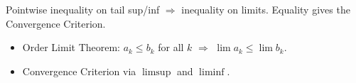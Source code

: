 \begin{remark*}
Pointwise inequality on tail sup/inf $\Rightarrow$ inequality on limits. Equality gives the Convergence Criterion.
\end{remark*}

\begin{remark*}[Dependencies]
\begin{itemize}
  \item Order Limit Theorem: $a_k \le b_k$ for all $k$ $\Rightarrow$ $\lim a_k \le \lim b_k$.
  \item Convergence Criterion via $\limsup$ and $\liminf$.
\end{itemize}
\end{remark*}
